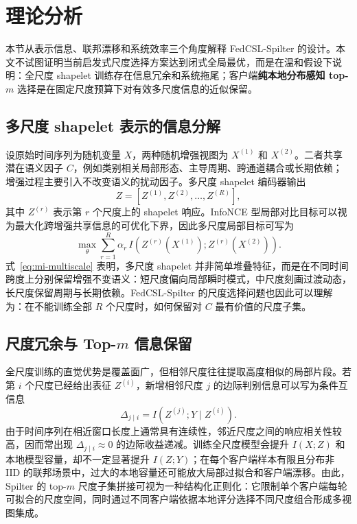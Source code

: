 \documentclass{article}
\begin{document}
\section{理论分析}

本节从表示信息、联邦漂移和系统效率三个角度解释 FedCSL-Spilter 的设计。本文不试图证明当前启发式尺度选择方案达到闭式全局最优，而是在温和假设下说明：全尺度 shapelet 训练存在信息冗余和系统拖尾；客户端\textbf{纯本地分布感知 top-$m$} 选择是在固定尺度预算下对有效多尺度信息的近似保留。

\subsection{多尺度 shapelet 表示的信息分解}

设原始时间序列为随机变量 $X$，两种随机增强视图为 $X^{(1)}$ 和 $X^{(2)}$。二者共享潜在语义因子 $C$，例如类别相关局部形态、主导周期、跨通道耦合或长期依赖；增强过程主要引入不改变语义的扰动因子。多尺度 shapelet 编码器输出
\begin{equation}
Z=\left[Z^{(1)},Z^{(2)},\ldots,Z^{(R)}\right],
\end{equation}
其中 $Z^{(r)}$ 表示第 $r$ 个尺度上的 shapelet 响应。InfoNCE 型局部对比目标可以视为最大化跨增强共享信息的可优化下界，因此多尺度局部目标可写为
\begin{equation}
\max_{\theta}\sum_{r=1}^{R}\alpha_r\,
I\!\left(Z^{(r)}(X^{(1)});Z^{(r)}(X^{(2)})\right).
\label{eq:mi-multiscale}
\end{equation}
式~\eqref{eq:mi-multiscale} 表明，多尺度 shapelet 并非简单堆叠特征，而是在不同时间跨度上分别保留增强不变语义：短尺度偏向局部瞬时模式，中尺度刻画过渡动态，长尺度保留周期与长期依赖。FedCSL-Spilter 的尺度选择问题也因此可以理解为：在不能训练全部 $R$ 个尺度时，如何保留对 $C$ 最有价值的尺度子集。

\subsection{尺度冗余与 Top-$m$ 信息保留}

全尺度训练的直觉优势是覆盖面广，但相邻尺度往往提取高度相似的局部片段。若第 $i$ 个尺度已经给出表征 $Z^{(i)}$，新增相邻尺度 $j$ 的边际判别信息可以写为条件互信息
\begin{equation}
\Delta_{j\mid i}=I\!\left(Z^{(j)};Y\mid Z^{(i)}\right).
\end{equation}
由于时间序列在相近窗口长度上通常具有连续性，邻近尺度之间的响应相关性较高，因而常出现 $\Delta_{j\mid i}\approx 0$ 的边际收益递减。训练全尺度模型会提升 $I(X;Z)$ 和本地模型容量，却不一定显著提升 $I(Z;Y)$；在每个客户端样本有限且分布非 IID 的联邦场景中，过大的本地容量还可能放大局部过拟合和客户端漂移。由此，Spilter 的 top-$m$ 尺度子集拼接可视为一种结构化正则化：它限制单个客户端每轮可拟合的尺度空间，同时通过不同客户端依据本地评分选择不同尺度组合形成多视图集成。
\end{document}
